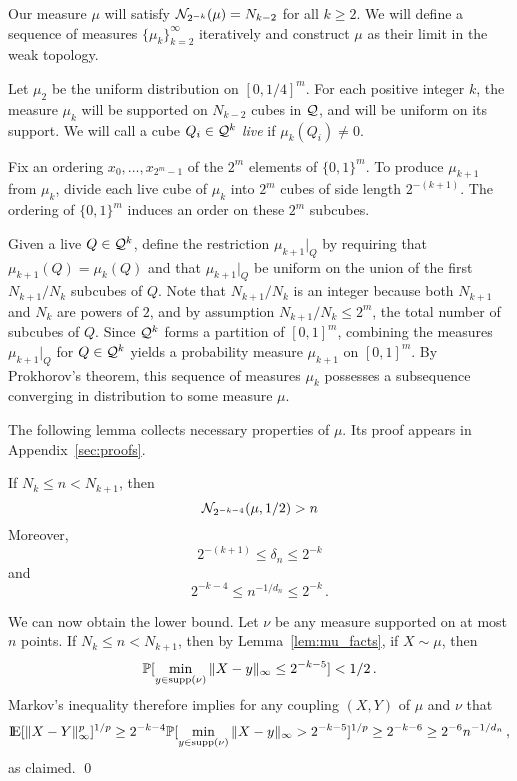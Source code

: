 Our measure $\mu$ will satisfy $\mathcal{N}_{2^{-k}}(\mu) = N_{k-2}$ for all $k \geq 2$.
We will define a sequence of measures $\{\mu_k\}_{k=2}^{\infty}$ iteratively and construct $\mu$ as their limit in the weak topology.

Let $\mu_2$ be the uniform distribution on $[0, 1/4]^m$.
For each positive integer $k$, the measure $\mu_k$ will be supported on $N_{k-2}$ cubes in $\mathcal{Q}$, and will be uniform on its support.
We will call a cube $Q_i \in \mathcal{Q}^k$ \emph{live} if $\mu_k(Q_i) \neq 0$.

Fix an ordering $x_0, \dots, x_{2^m-1}$ of the $2^m$ elements of $\{0, 1\}^m$.
To produce $\mu_{k+1}$ from $\mu_k$, divide each live cube of $\mu_k$ into $2^m$ cubes of side length $2^{-(k+1)}$.
The ordering of $\{0, 1\}^m$ induces an order on these $2^m$ subcubes.

Given a live $Q \in \mathcal{Q}^k$, define the restriction $\mu_{k+1}|_{Q}$ by requiring that $\mu_{k+1}(Q) = \mu_k(Q)$ and that $\mu_{k+1}|_Q$ be uniform on the union of the first $N_{k+1}/N_k$ subcubes of $Q$.
Note that $N_{k+1}/N_k$ is an integer because both $N_{k+1}$ and $N_k$ are powers of $2$, and by assumption $N_{k+1}/N_k \leq 2^m$, the total number of subcubes of $Q$.
Since $\mathcal{Q}^k$ forms a partition of $[0, 1]^m$, combining the measures $\mu_{k+1}|_Q$ for $Q \in \mathcal{Q}^k$ yields a probability measure $\mu_{k+1}$ on $[0, 1]^m$.
By Prokhorov's theorem, this sequence of measures $\mu_k$ possesses a subsequence converging in distribution to some measure $\mu$.

The following lemma collects necessary properties of $\mu$.
Its proof appears in Appendix~\ref{sec:proofs}.
\begin{applemma}\label{lem:mu_facts}
If $N_k \leq n < N_{k+1}$, then
\begin{equation*}
\mathcal{N}_{2^{-k-4}}(\mu, 1/2) > n
\end{equation*}
Moreover,
\begin{equation*}
2^{-(k+1)} \leq \delta_n \leq 2^{-k}
\end{equation*}
and
\begin{equation*}
2^{-k -4} \leq n^{-1/d_n} \leq 2^{-k}\,.
\end{equation*}
\end{applemma}

We can now obtain the lower bound.
Let $\nu$ be any measure supported on at most $n$ points.
If $N_k \leq n < N_{k+1}$, then by Lemma~\ref{lem:mu_facts}, if $X \sim \mu$, then
\begin{equation*}
\mathbb{P}[\min_{y \in \operatorname{supp}(\nu)} \|X - y\|_\infty \leq 2^{-k-5}] < 1/2\,.
\end{equation*}
Markov's inequality therefore implies for any coupling $(X, Y)$ of $\mu$ and $\nu$ that
\begin{equation*}
{\rm I}\kern-0.18em{\rm E}[\|X - Y\|_\infty^p]^{1/p} \geq 2^{-k-4}\mathbb{P}[\min_{y \in \operatorname{supp}(\nu)} \|X - y\|_\infty > 2^{-k-5}]^{1/p} \geq 2^{-k-6} \geq 2^{-6}n^{-1/d_n}\,,
\end{equation*}
as claimed.
\qed



